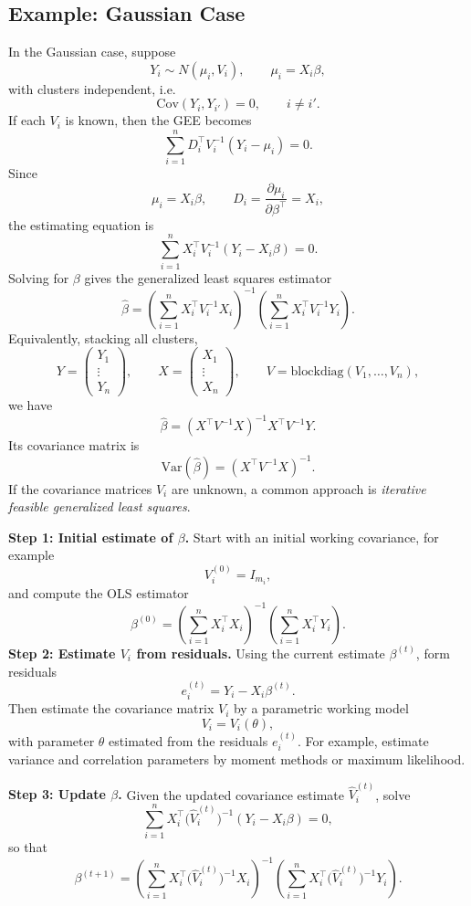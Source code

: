 \documentclass[11pt]{article}
\theoremstyle{definition}
\begin{document}
\subsection*{Example: Gaussian Case}
In the Gaussian case, suppose
\[
Y_i \sim N(\mu_i,V_i), \qquad \mu_i = X_i\beta,
\]
with clusters independent, i.e.
\[
\mathrm{Cov}(Y_i,Y_{i'})=0, \qquad i\neq i'.
\]
If each \(V_i\) is known, then the GEE becomes
\[
\sum_{i=1}^n D_i^\top V_i^{-1}(Y_i-\mu_i)=0.
\]
Since
\[
\mu_i=X_i\beta,
\qquad
D_i=\frac{\partial \mu_i}{\partial \beta^\top}=X_i,
\]
the estimating equation is
\[
\sum_{i=1}^n X_i^\top V_i^{-1}(Y_i-X_i\beta)=0.
\]
Solving for \(\beta\) gives the generalized least squares estimator
\[
\hat\beta
=
\left(\sum_{i=1}^n X_i^\top V_i^{-1}X_i\right)^{-1}
\left(\sum_{i=1}^n X_i^\top V_i^{-1}Y_i\right).
\]
Equivalently, stacking all clusters,
\[
Y=
\begin{pmatrix}
Y_1\\ \vdots\\ Y_n
\end{pmatrix},
\qquad
X=
\begin{pmatrix}
X_1\\ \vdots\\ X_n
\end{pmatrix},
\qquad
V=\mathrm{blockdiag}(V_1,\dots,V_n),
\]
we have
\[
\hat\beta=(X^\top V^{-1}X)^{-1}X^\top V^{-1}Y.
\]
Its covariance matrix is
\[
\mathrm{Var}(\hat\beta)=(X^\top V^{-1}X)^{-1}.
\]
If the covariance matrices \(V_i\) are unknown, a common approach is \emph{iterative feasible generalized least squares}.
\medskip

\textbf{Step 1: Initial estimate of \(\beta\).}  
Start with an initial working covariance, for example
\[
V_i^{(0)}=I_{m_i},
\]
and compute the OLS estimator
\[
\beta^{(0)}
=
\left(\sum_{i=1}^n X_i^\top X_i\right)^{-1}
\left(\sum_{i=1}^n X_i^\top Y_i\right).
\]
\medskip
\textbf{Step 2: Estimate \(V_i\) from residuals.}  
Using the current estimate \(\beta^{(t)}\), form residuals
\[
e_i^{(t)} = Y_i - X_i\beta^{(t)}.
\]
Then estimate the covariance matrix \(V_i\) by a parametric working model
\[
V_i = V_i(\theta),
\]
with parameter \(\theta\) estimated from the residuals \(e_i^{(t)}\). For example, estimate variance and correlation parameters by moment methods or maximum likelihood.
\medskip

\textbf{Step 3: Update \(\beta\).}  
Given the updated covariance estimate \(\hat V_i^{(t)}\), solve
\[
\sum_{i=1}^n X_i^\top \bigl(\hat V_i^{(t)}\bigr)^{-1}(Y_i-X_i\beta)=0,
\]
so that
\[
\beta^{(t+1)}
=
\left(\sum_{i=1}^n X_i^\top \bigl(\hat V_i^{(t)}\bigr)^{-1}X_i\right)^{-1}
\left(\sum_{i=1}^n X_i^\top \bigl(\hat V_i^{(t)}\bigr)^{-1}Y_i\right).
\]
\end{document}
